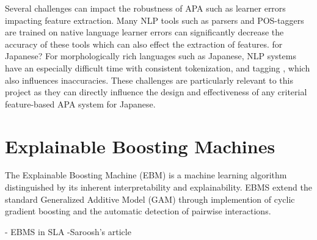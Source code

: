 Several challenges can impact the robustness of APA such as learner errors impacting feature extraction. Many
NLP tools such as parsers and POS-taggers are trained on native language learner errors can
significantly decrease the accuracy of these tools which can also effect the extraction of features. %
for Japanese?
For morphologically rich languages such as Japanese, NLP systems have an especially difficult time with consistent
tokenization, and tagging , which also influences inaccuracies. These challenges are particularly relevant to this
project as they can directly influence the design and effectiveness of any criterial feature-based APA system for
Japanese.


\section{Explainable Boosting Machines}
The Explainable Boosting Machine (EBM)\citet{nori2019} is a machine learning algorithm distinguished by its
inherent
interpretability and explainability. EBMS extend the standard Generalized Additive Model (GAM) through implemention of
cyclic
gradient boosting and the automatic detection of pairwise interactions.

- EBMS in SLA
\citep{akef2025}-Saroosh's article